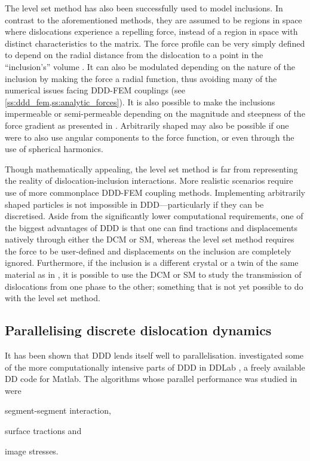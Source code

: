 The level set method has also been successfully used to model inclusions. In contrast to the aforementioned methods, they are assumed to be regions in space where dislocations experience a repelling force, instead of a region in space with distinct characteristics to the matrix. The force profile can be very simply defined to depend on the radial distance from the dislocation to a point in the ``inclusion's'' volume \cite{ddd_inclusion_as_force}. It can also be modulated depending on the nature of the inclusion by making the force a radial function, thus avoiding many of the numerical issues facing DDD-FEM couplings (see \cref{ss:ddd_fem,ss:analytic_forces}). It is also possible to make the inclusions impermeable or semi-permeable depending on the magnitude and steepness of the force gradient as presented in \cite{ddd_inclusion_as_force}. Arbitrarily shaped may also be possible if one were to also use angular components to the force function, or even through the use of spherical harmonics.

Though mathematically appealing, the level set method is far from representing the reality of dislocation-inclusion interactions. More realistic scenarios require use of more commonplace DDD-FEM coupling methods. Implementing arbitrarily shaped particles is not impossible in DDD---particularly if they can be discretised. Aside from the significantly lower computational requirements, one of the biggest advantages of DDD is that one can find tractions and displacements natively through either the DCM or SM, whereas the level set method requires the force to be user-defined and displacements on the inclusion are completely ignored. Furthermore, if the inclusion is a different crystal or a twin of the same material as in \cite{twinning}, it is possible to use the DCM or SM to study the transmission of dislocations from one phase to the other; something that is not yet possible to do with the level set method.

\subsection{Parallelising discrete dislocation dynamics}
\label{ss:parallel_ddd}
It has been shown that DDD lends itself well to parallelisation.  investigated some of the more computationally intensive parts of DDD in DDLab \cite{ddlab}, a freely available DD code for Matlab. The algorithms whose parallel performance was studied in \cite{gpu_ddd} were
\begin{inparaenum}
    \item segment-segment interaction,
    \item surface tractions and
    \item image stresses.
\end{inparaenum}

